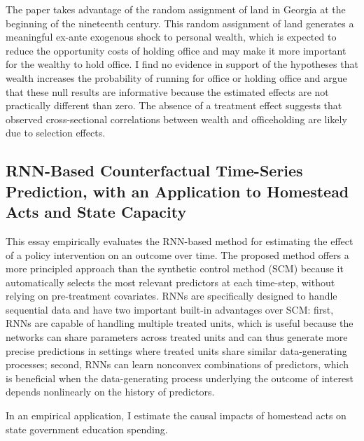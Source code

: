 The paper takes advantage of the random assignment of land in Georgia at the beginning of the nineteenth century. This random assignment of land generates a meaningful ex-ante exogenous shock to personal wealth, which is expected to reduce the opportunity costs of holding office and may make it more important for the wealthy to hold office. I find no evidence in support of the hypotheses that wealth increases the probability of running for office or holding office and argue that these null results are informative because the estimated effects are not practically different than zero. The absence of a treatment effect suggests that observed cross-sectional correlations between wealth and officeholding are likely due to selection effects. 

\subsection{RNN-Based Counterfactual Time-Series Prediction, with an Application to Homestead Acts and State Capacity}
This essay empirically evaluates the RNN-based method for estimating the effect of a policy intervention on an outcome over time. The proposed method offers a more principled approach than the synthetic control method (SCM) because it automatically selects the most relevant predictors at each time-step, without relying on pre-treatment covariates. RNNs are specifically designed to handle sequential data and have two important built-in advantages over SCM: first, RNNs are capable of handling multiple treated units, which is useful because the networks can share parameters across treated units and can thus generate more precise predictions in settings where treated units share similar data-generating processes; second, RNNs can learn nonconvex combinations of predictors, which is beneficial when the data-generating process underlying the outcome of interest depends nonlinearly on the history of predictors. 

In an empirical application, I estimate the causal impacts of homestead acts on state government education spending.